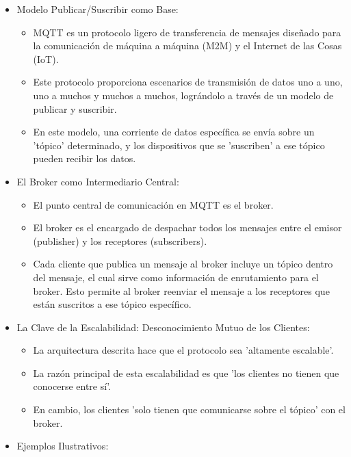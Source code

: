\documentclass{report}
\begin{document}
\begin{itemize}
    \item Modelo Publicar/Suscribir como Base:
        \begin{itemize}
            \item MQTT es un protocolo ligero de transferencia de mensajes diseñado para la comunicación de máquina a máquina (M2M) y 
            el Internet de las Cosas (IoT).
            \item Este protocolo proporciona escenarios de transmisión de datos uno a uno, uno a muchos y muchos a muchos, lográndolo a 
            través de un modelo de publicar y suscribir.
            \item En este modelo, una corriente de datos específica se envía sobre un 'tópico' determinado, y los dispositivos que se 
            'suscriben' a ese tópico pueden recibir los datos.
        \end{itemize}
    \item El Broker como Intermediario Central:
        \begin{itemize}
            \item El punto central de comunicación en MQTT es el broker.
            \item El broker es el encargado de despachar todos los mensajes entre el emisor (publisher) y los receptores (subscribers).
            \item Cada cliente que publica un mensaje al broker incluye un tópico dentro del mensaje, el cual sirve como información de 
            enrutamiento para el broker. Esto permite al broker reenviar el mensaje a los receptores que están suscritos a 
            ese tópico específico.
        \end{itemize}
    \item La Clave de la Escalabilidad: Desconocimiento Mutuo de los Clientes:
        \begin{itemize}
            \item La arquitectura descrita hace que el protocolo sea 'altamente escalable'.
            \item La razón principal de esta escalabilidad es que 'los clientes no tienen que conocerse entre sí'.
            \item En cambio, los clientes 'solo tienen que comunicarse sobre el tópico' con el broker.
        \end{itemize}
    \item Ejemplos Ilustrativos:
        \begin{itemize}

\end{itemize}
\end{itemize}
\end{document}
